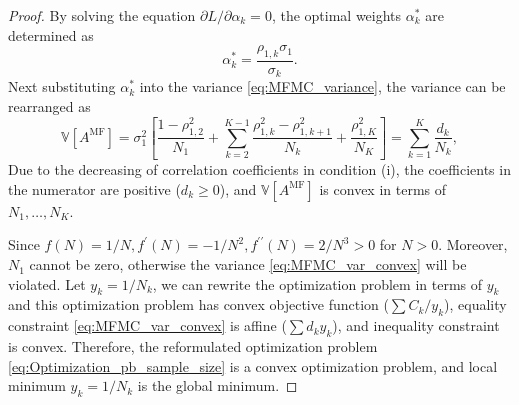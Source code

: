 \begin{proof}

By solving the equation $\partial L/\partial \alpha_k=0$, the optimal weights $\alpha_k^*$ are determined as
%
\[
\alpha_k^*=\frac{\rho_{1,k}\sigma_1}{\sigma_k}.
\]
%
Next substituting $\alpha_k^*$ into the variance \eqref{eq:MFMC_variance}, the variance can be rearranged as
%
\begin{equation}\label{eq:MFMC_var_convex}
    \mathbb{V}\left[A^{\text{MF}}\right]=\sigma_1^2\left[\frac{1-\rho_{1,2}^2}{N_1} + \sum_{k=2}^{K-1} \frac{\rho_{1,k}^2-\rho_{1,k+1}^2}{N_k} + \frac{\rho_{1,K}^2}{N_K} \right] = \sum_{k=1}^K\frac{d_k}{N_k},
\end{equation}
%
Due to the decreasing of correlation coefficients in condition (i), the coefficients in the numerator are positive ($d_k\ge 0$), and $\mathbb{V}\left[A^{\text{MF}}\right]$ is convex in terms of $N_1,\ldots, N_K$. 

Since $f(N)=1/N, f^\prime (N)=-1/N^2, f^{\prime\prime}(N)=2/N^3>0$ for $N>0$. Moreover, $N_1$ cannot be zero, otherwise the variance \eqref{eq:MFMC_var_convex} will be violated. Let $y_k = 1/N_k$, we can rewrite the optimization problem in terms of $y_k$ and this optimization problem has convex objective function ($\sum C_k/y_k$), equality constraint \eqref{eq:MFMC_var_convex} is affine ($\sum d_k y_k$), and inequality constraint is convex. Therefore, the reformulated optimization problem \eqref{eq:Optimization_pb_sample_size} is a convex optimization problem, and local minimum $y_k = 1/N_k$ is the global minimum.



\end{proof}
